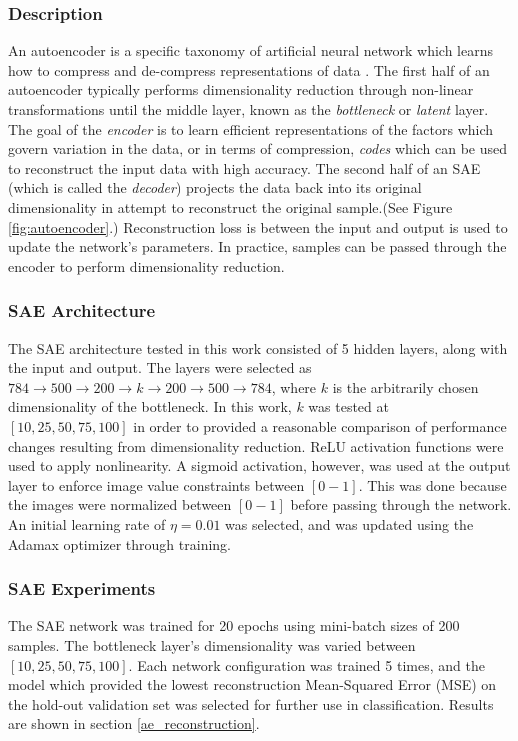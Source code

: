 \documentclass[conference]{IEEEtran}
\begin{document}
	 \subsubsection*{Description}
	 An autoencoder is a specific taxonomy of artificial neural network which learns how to  compress and de-compress representations of data \cite{Haykin2009NeuralNetworks,Goodfellow2016DeepLearning}. The first half of an autoencoder typically performs dimensionality reduction through non-linear transformations until the middle layer, known as the \textit{bottleneck} or \textit{latent} layer.  The goal of the \textit{encoder} is to learn efficient representations of the factors which govern variation in the data, or in terms of compression, \textit{codes} which can be used to reconstruct the input  data with high accuracy. The second half of an SAE (which is called the \textit{decoder}) projects the data back into its original dimensionality in attempt to reconstruct the original sample.(See Figure \ref{fig:autoencoder}.) Reconstruction loss is between the input and output is used to update the network's parameters.  In practice, samples can be passed through the encoder to perform dimensionality reduction. 
	 
  	\subsubsection*{SAE Architecture}
  	The SAE architecture tested in this work consisted of 5 hidden layers, along with the input and output.  The layers were selected as $784 \rightarrow 500 \rightarrow 200 \rightarrow k \rightarrow 200 \rightarrow 500 \rightarrow 784$, where $k$ is the arbitrarily chosen dimensionality of the bottleneck.  In this work, $k$ was tested at $[10,25,50,75,100]$ in order to provided a reasonable comparison of performance changes resulting from dimensionality reduction.  ReLU activation functions were used to apply nonlinearity.  A sigmoid activation, however, was used at the output layer to enforce image value constraints between $[0-1]$.  This was done because the images were normalized between $[0-1]$ before passing through the network.  An initial learning rate of $\eta=0.01$ was selected, and was updated using the Adamax optimizer through training.
  	
  	\subsubsection*{SAE Experiments}
  	The SAE network was trained for 20 epochs using mini-batch sizes of 200 samples.  The bottleneck layer's dimensionality was varied between $[10,25,50,75,100]$.  Each network configuration was trained 5 times, and the model which provided the lowest reconstruction  Mean-Squared Error (MSE) on the hold-out validation set was selected for further use in classification.  Results are shown in section \ref{ae_reconstruction}.
  	
\end{document}

